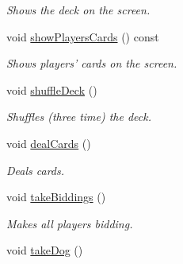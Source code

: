 \begin{DoxyCompactItemize}
\begin{DoxyCompactList}\small\item\em \-Shows the deck on the screen. \end{DoxyCompactList}\item 
\hypertarget{classGame_aed6d30748ef9db0a89fba543fa4b5dfb}{void \hyperlink{classGame_aed6d30748ef9db0a89fba543fa4b5dfb}{show\-Players\-Cards} () const }\label{classGame_aed6d30748ef9db0a89fba543fa4b5dfb}

\begin{DoxyCompactList}\small\item\em \-Shows players' cards on the screen. \end{DoxyCompactList}\item 
\hypertarget{classGame_a8eb0a092d23b426a8b4b03c4083b7afe}{void \hyperlink{classGame_a8eb0a092d23b426a8b4b03c4083b7afe}{shuffle\-Deck} ()}\label{classGame_a8eb0a092d23b426a8b4b03c4083b7afe}

\begin{DoxyCompactList}\small\item\em \-Shuffles (three time) the deck. \end{DoxyCompactList}\item 
\hypertarget{classGame_a234bc66c5663548d90368ecd142591b2}{void \hyperlink{classGame_a234bc66c5663548d90368ecd142591b2}{deal\-Cards} ()}\label{classGame_a234bc66c5663548d90368ecd142591b2}

\begin{DoxyCompactList}\small\item\em \-Deals cards. \end{DoxyCompactList}\item 
\hypertarget{classGame_ae8240e18a7b5ed1adec7663278afc256}{void \hyperlink{classGame_ae8240e18a7b5ed1adec7663278afc256}{take\-Biddings} ()}\label{classGame_ae8240e18a7b5ed1adec7663278afc256}

\begin{DoxyCompactList}\small\item\em \-Makes all players bidding. \end{DoxyCompactList}\item 
\hypertarget{classGame_ab725d07327db4dfb836e90eb08c83393}{void \hyperlink{classGame_ab725d07327db4dfb836e90eb08c83393}{take\-Dog} ()}\label{classGame_ab725d07327db4dfb836e90eb08c83393}


\end{DoxyCompactItemize}
